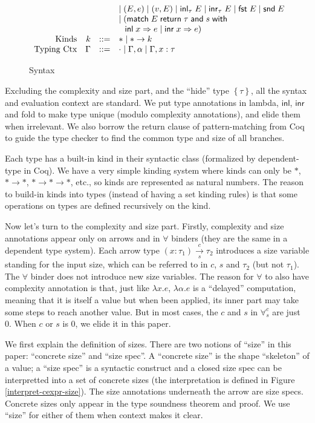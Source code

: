 \documentclass[preprint]{sigplanconf}
\newcommand{\thide}[1]{\left \{ #1 \right \}}
\newcommand{\arrow}[4]{#1\xrightarrow[#3]{#2}#4}
\newcommand{\symand}{\mathsf{\;and\;}}
\newcommand{\symmatch}{\mathsf{match}}
\newcommand{\symwith}{\mathsf{\;with\;}}
\newcommand{\symreturn}{\mathsf{\;return\;}}
\newcommand{\syminl}{\mathsf{inl}}
\newcommand{\syminr}{\mathsf{inr}}
\newcommand{\intro}[2]{(#1 : #2)}
\newcommand{\symfst}{\mathsf{fst}}
\newcommand{\symsnd}{\mathsf{snd}}
\begin{document}
\begin{figure}
$$\begin{array}{rrcl}
  & & & \mid (E, e) \mid (v, E) \mid \syminl_\tau\;E \mid \syminr_\tau\;E \mid \symfst\;E \mid \symsnd\;E \\
  & & & \mid (\symmatch\;E\symreturn \tau \symand s \symwith \\
  & & & \hspace{.1in} \syminl\;x\Rightarrow e\;|\;\syminr\;x\Rightarrow e) \\
  \textrm{Kinds} & k &::=& * \mid *\to k \\
  \textrm{Typing Ctx} & \Gamma &::=& \cdot \mid \Gamma,\alpha \mid \Gamma, x:\tau
\end{array}$$
\caption{\label{syntax}Syntax}
\end{figure}

Excluding the complexity and size part, and the ``hide'' type $\thide{\tau}$, all the syntax and evaluation context are standard. We put type annotations in lambda, $\syminl$, $\syminr$ and fold to make type unique (modulo complexity annotations), and elide them when irrelevant. We also borrow the return clause of pattern-matching from Coq to guide the type checker to find the common type and size of all branches. 

Each type has a built-in kind in their syntactic class (formalized by dependent-type in Coq). We have a very simple kinding system where kinds can only be $*$, $*\to *$, $*\to *\to *$, etc., so kinds are represented as natural numbers. The reason to build-in kinds into types (instead of having a set kinding rules) is that some operations on types are defined recursively on the kind.

Now let's turn to the complexity and size part. Firstly, complexity and size annotations appear only on arrows and in $\forall$ binders (they are the same in a dependent type system). Each arrow type $\arrow{\intro{x}{\tau_1}}{c}{s}{\tau_2}$ introduces a size variable standing for the input size, which can be referred to in $c$, $s$ and $\tau_2$ (but not $\tau_1$). The $\forall$ binder does not introduce new size variables. The reason for $\forall$ to also have complexity annotation is that, just like $\lambda x.e$, $\lambda \alpha.e$ is a ``delayed'' computation, meaning that it is itself a value but when been applied, its inner part may take some steps to reach another value. But in most cases, the $c$ and $s$ in $\forall^c_s$ are just 0. When $c$ or $s$ is 0, we elide it in this paper.

We first explain the definition of sizes. There are two notions of ``size'' in this paper: ``concrete size'' and ``size spec''. A ``concrete size'' is the shape ``skeleton'' of a value; a ``size spec'' is a syntactic construct and a closed size spec can be interpretted into a set of concrete sizes (the interpretation is defined in Figure \ref{interpret-cexpr-size}). The size annotations underneath the arrow are size specs. Concrete sizes only appear in the type soundness theorem and proof. We use ``size'' for either of them when context makes it clear.
\end{document}
